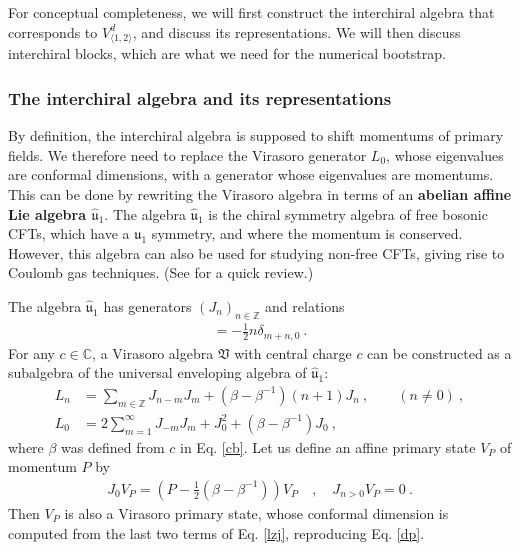 \documentclass[12pt, a4paper]{article}
\newcommand{\myindex}[1]{\textbf{\boldmath #1}}
\theoremstyle{break}
\begin{document}
For conceptual completeness, we will first construct the interchiral algebra that corresponds to $V^d_{\langle 1,2\rangle}$, and discuss its representations. We will then discuss interchiral blocks, which are what we need for the numerical bootstrap.

\subsubsection{The interchiral algebra and its representations}

By definition, the interchiral algebra is supposed to shift momentums of primary fields. We therefore need to replace the Virasoro generator $L_0$, whose eigenvalues are conformal dimensions, with a generator whose eigenvalues are momentums. This can be done by rewriting the Virasoro algebra in terms of an \myindex{abelian affine Lie algebra $\hat{\mathfrak{u}}_1$}. The algebra $\hat{\mathfrak{u}}_1$ is the chiral symmetry algebra of free bosonic CFTs, which have a $\mathfrak{u}_1$ symmetry, and where the momentum is conserved. 
However, this algebra can also be used for studying non-free CFTs, giving rise to Coulomb gas techniques. (See \cite[Section 4.1]{rib14} for a quick review.)

The algebra $\hat{\mathfrak{u}}_1$ has generators $(J_n)_{n\in\mathbb{Z}}$ and relations 
\begin{align}
 [J_m,J_n] = -\frac12 n\delta_{m+n,0}\ . 
\end{align}
For any $c\in\mathbb{C}$, a Virasoro algebra $\mathfrak{V}$ with central charge $c$ can be constructed as a subalgebra of the universal enveloping algebra of $\hat{\mathfrak{u}}_1$:
\begin{align}
 L_n &= \sum_{m\in{\mathbb{Z}}} J_{n-m}J_m + \left(\beta-\beta^{-1}\right)(n+1)J_n\ , \qquad (n\neq 0)\ ,
\label{lnj}
\\
L_0 &=2\sum_{m=1}^\infty J_{-m}J_m +J_0^2+\left(\beta-\beta^{-1}\right)J_0 \ ,
\label{lzj}
\end{align}
where $\beta$ was defined from $c$ in Eq. \eqref{cb}. Let us define an affine primary state $V_P$ of momentum $P$ by 
\begin{align}
 J_0 V_P  = \left(P-\tfrac12\left(\beta-\beta^{-1}\right) \right) V_P \quad , \quad J_{n>0} V_P = 0\ .
\end{align}
Then $V_P$ is also a Virasoro primary state, whose conformal dimension is computed from the last two terms of Eq. \eqref{lzj}, reproducing Eq. \eqref{dp}. 
\end{document}
